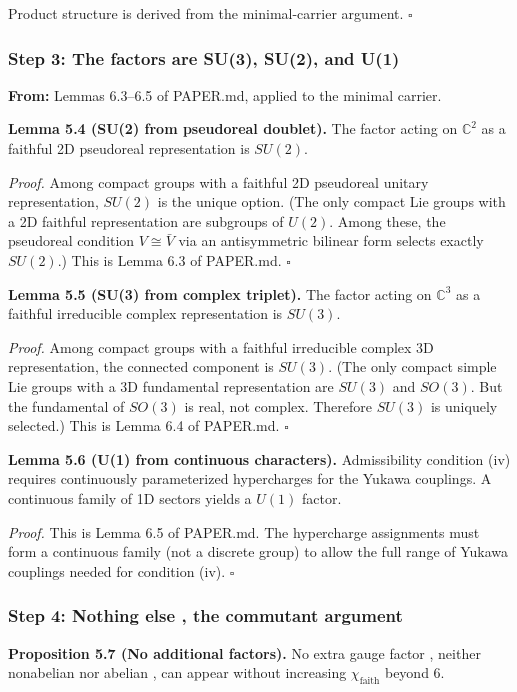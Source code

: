 Product structure is derived from the minimal-carrier argument. \(\square\)

\subsubsection{Step 3: The factors are SU(3), SU(2), and U(1)}\label{step-3-the-factors-are-su3-su2-and-u1}

\textbf{From:} Lemmas 6.3--6.5 of PAPER.md, applied to the minimal carrier.

\textbf{Lemma 5.4 (SU(2) from pseudoreal doublet).} The factor acting on \(\mathbb{C}^2\) as a faithful 2D pseudoreal representation is \(SU(2)\).

\emph{Proof.} Among compact groups with a faithful 2D pseudoreal unitary representation, \(SU(2)\) is the unique option. (The only compact Lie groups with a 2D faithful representation are subgroups of \(U(2)\). Among these, the pseudoreal condition \(V \cong \bar{V}\) via an antisymmetric bilinear form selects exactly \(SU(2)\).) This is Lemma 6.3 of PAPER.md. \(\square\)

\textbf{Lemma 5.5 (SU(3) from complex triplet).} The factor acting on \(\mathbb{C}^3\) as a faithful irreducible complex representation is \(SU(3)\).

\emph{Proof.} Among compact groups with a faithful irreducible complex 3D representation, the connected component is \(SU(3)\). (The only compact simple Lie groups with a 3D fundamental representation are \(SU(3)\) and \(SO(3)\). But the fundamental of \(SO(3)\) is real, not complex. Therefore \(SU(3)\) is uniquely selected.) This is Lemma 6.4 of PAPER.md. \(\square\)

\textbf{Lemma 5.6 (U(1) from continuous characters).} Admissibility condition (iv) requires continuously parameterized hypercharges for the Yukawa couplings. A continuous family of 1D sectors yields a \(U(1)\) factor.

\emph{Proof.} This is Lemma 6.5 of PAPER.md. The hypercharge assignments must form a continuous family (not a discrete group) to allow the full range of Yukawa couplings needed for condition (iv). \(\square\)

\subsubsection{Step 4: Nothing else , the commutant argument}\label{step-4-nothing-else--the-commutant-argument}

\textbf{Proposition 5.7 (No additional factors).} No extra gauge factor , neither nonabelian nor abelian , can appear without increasing \(\chi_{\mathrm{faith}}\) beyond 6.

